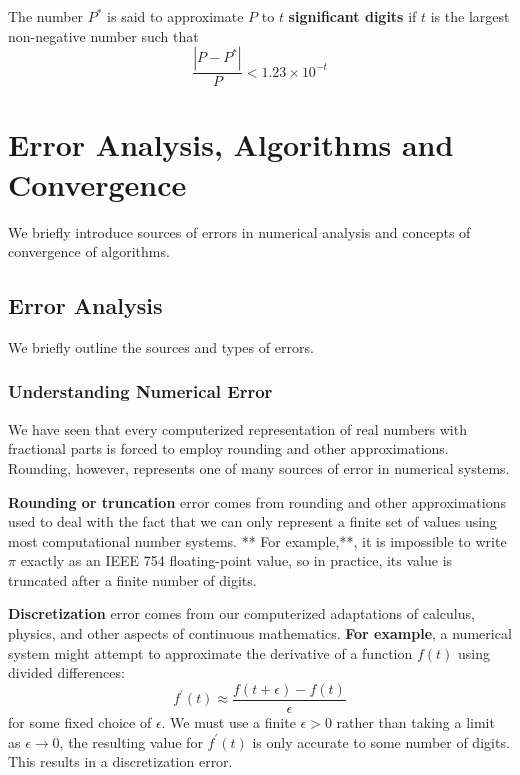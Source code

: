 \documentclass[
]{book}
\begin{document}
The number \(P^*\) is said to approximate \(P\) to \(t\) \textbf{significant digits} if \(t\) is the largest non-negative number such that \[
\frac{|P-P^*|}{P} < 1.23\times 10^{-t}
\]

\hypertarget{error-analysis-algorithms-and-convergence}{%
\chapter{Error Analysis, Algorithms and Convergence}\label{error-analysis-algorithms-and-convergence}}

We briefly introduce sources of errors in numerical analysis and concepts of convergence of algorithms.

\hypertarget{error-analysis}{%
\section{Error Analysis}\label{error-analysis}}

We briefly outline the sources and types of errors.

\hypertarget{understanding-numerical-error}{%
\subsection{Understanding Numerical Error}\label{understanding-numerical-error}}

We have seen that every computerized representation of real numbers with fractional parts is forced to employ rounding and other approximations. Rounding, however, represents one of many sources of error in numerical systems.

\textbf{Rounding or truncation} error comes from rounding and other approximations used to deal with the fact that we can only represent a finite set of values using most computational number systems. ** For example,**, it is impossible to write \(\pi\) exactly as an IEEE 754 floating-point value, so in practice, its value is truncated after a finite number of digits.

\textbf{Discretization} error comes from our computerized adaptations of calculus, physics,
and other aspects of continuous mathematics. \textbf{For example}, a numerical system might
attempt to approximate the derivative of a function \(f(t)\) using divided differences:
\[
f^\prime(t) \approx \frac{f(t+\epsilon) - f(t)}{\epsilon}
\]
for some fixed choice of \(\epsilon\). We must use a finite \(\epsilon > 0\) rather than taking a
limit as \(\epsilon → 0\), the resulting value for \(f^\prime(t)\) is only accurate to some number of digits. This results in a discretization error.
\end{document}
